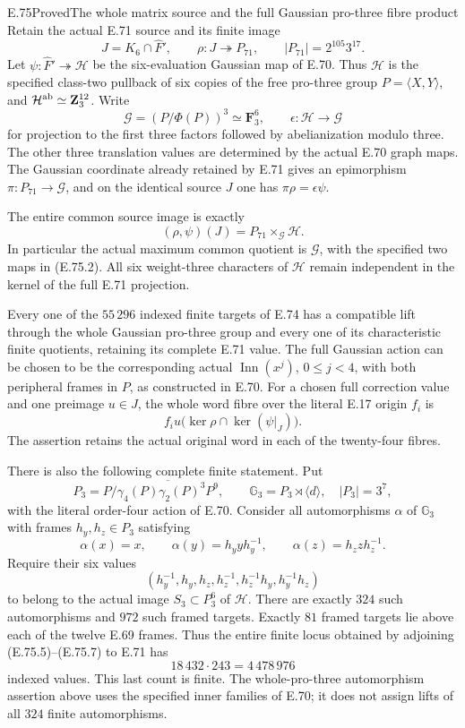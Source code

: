 \begin{statement}{E.75}{Proved}{The whole matrix source and the full Gaussian pro-three fibre product}
Retain the actual E.71 source and its finite image
\[
 J=K_6\cap\widehat F',\qquad
 \rho:J\twoheadrightarrow P_{71},\qquad
 |P_{71}|=2^{105}3^{17}.
 \tag{E.75.1}
\]
Let $\psi:\widehat F'\twoheadrightarrow\mathcal H$ be the
six-evaluation Gaussian map of E.70. Thus $\mathcal H$ is the
specified class-two pullback of six copies of the free pro-three
group $P=\langle X,Y\rangle$, and
$\mathcal H^{\rm ab}\simeq\mathbf Z_3^{12}$.
Write
\[
 \mathcal G=(P/\Phi(P))^3\simeq\mathbf F_3^6,
 \qquad
 \epsilon:\mathcal H\longrightarrow\mathcal G
 \tag{E.75.2}
\]
for projection to the first three factors followed by
abelianization modulo three. The other three translation values
are determined by the actual E.70 graph maps. The Gaussian
coordinate already retained by E.71 gives an epimorphism
$\pi:P_{71}\to\mathcal G$, and on the identical source $J$
one has $\pi\rho=\epsilon\psi$.

The entire common source image is exactly
\[
       (\rho,\psi)(J)=P_{71}\times_{\mathcal G}\mathcal H.
 \tag{E.75.3}
\]
In particular the actual maximum common quotient is
$\mathcal G$, with the specified two maps in (E.75.2).
All six weight-three characters of $\mathcal H$ remain
independent in the kernel of the full E.71 projection.

Every one of the $55\,296$ indexed finite targets of E.74
has a compatible lift through the whole Gaussian pro-three
group and every one of its characteristic finite quotients,
retaining its complete E.71 value. The full Gaussian action
can be chosen to be the corresponding actual
$\operatorname{Inn}(x^j)$, $0\leq j<4$, with both peripheral
frames in $P$, as constructed in E.70.
For a chosen full correction value and one preimage $u\in J$,
the whole word fibre over the literal E.17 origin $f_i$ is
\[
       f_i u\bigl(\ker\rho\cap\ker(\psi|_J)\bigr).
 \tag{E.75.4}
\]
The assertion retains the actual original word in each of the
twenty-four fibres.

There is also the following complete finite statement. Put
\[
 P_3=P/\overline{\gamma_4(P)\gamma_2(P)^3P^9},
 \qquad \mathbb G_3=P_3\rtimes\langle d\rangle,
 \quad |P_3|=3^7,
 \tag{E.75.5}
\]
with the literal order-four action of E.70. Consider all
automorphisms $\alpha$ of $\mathbb G_3$ with frames
$h_y,h_z\in P_3$ satisfying
\[
 \alpha(x)=x,\qquad
 \alpha(y)=h_yyh_y^{-1},\qquad
 \alpha(z)=h_zzh_z^{-1}.
 \tag{E.75.6}
\]
Require their six values
\[
 (h_y^{-1},h_y,h_z,h_z^{-1},h_z^{-1}h_y,h_y^{-1}h_z)
 \tag{E.75.7}
\]
to belong to the actual image $S_3\subset P_3^6$ of
$\mathcal H$. There are exactly $324$ such automorphisms
and $972$ such framed targets. Exactly $81$ framed targets
lie above each of the twelve E.69 frames. Thus the entire
finite locus obtained by adjoining (E.75.5)--(E.75.7) to
E.71 has
\[
                 18\,432\cdot243=4\,478\,976
 \tag{E.75.8}
\]
indexed values. This last count is finite. The whole-pro-three
automorphism assertion above uses the specified inner families
of E.70; it does not assign lifts of all $324$ finite
automorphisms.
\end{statement}

